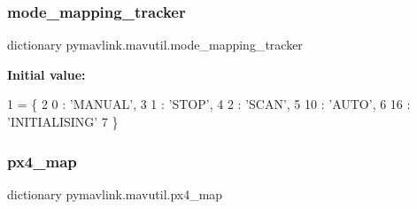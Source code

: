 \subsubsection{\texorpdfstring{mode\+\_\+mapping\+\_\+tracker}{mode\_mapping\_tracker}}
{\footnotesize\ttfamily dictionary pymavlink.\+mavutil.\+mode\+\_\+mapping\+\_\+tracker}

{\bfseries Initial value\+:}
\begin{DoxyCode}
1 =  \{
2     0 : \textcolor{stringliteral}{'MANUAL'},
3     1 : \textcolor{stringliteral}{'STOP'},
4     2 : \textcolor{stringliteral}{'SCAN'},
5     10 : \textcolor{stringliteral}{'AUTO'},
6     16 : \textcolor{stringliteral}{'INITIALISING'}
7     \}
\end{DoxyCode}
\mbox{\label{namespacepymavlink_1_1mavutil_ab6d8931a7f4086e5bfbc12c07ea21a04}} 
\subsubsection{\texorpdfstring{px4\+\_\+map}{px4\_map}}
{\footnotesize\ttfamily dictionary pymavlink.\+mavutil.\+px4\+\_\+map}


